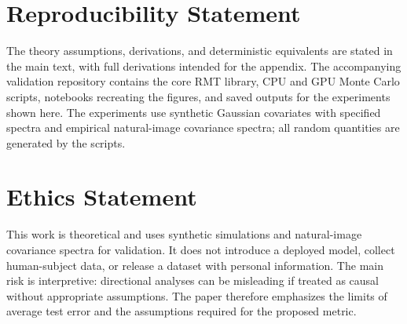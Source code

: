 \documentclass{article}
\theoremstyle{plain}
\theoremstyle{definition}
\begin{document}
\clearpage




\section{Reproducibility Statement}

The theory assumptions, derivations, and deterministic equivalents are stated in the main text, with full derivations intended for the appendix. The accompanying validation repository contains the core RMT library, CPU and GPU Monte Carlo scripts, notebooks recreating the figures, and saved outputs for the experiments shown here. The experiments use synthetic Gaussian covariates with specified spectra and empirical natural-image covariance spectra; all random quantities are generated by the scripts.

\section{Ethics Statement}

This work is theoretical and uses synthetic simulations and natural-image covariance spectra for validation. It does not introduce a deployed model, collect human-subject data, or release a dataset with personal information. The main risk is interpretive: directional analyses can be misleading if treated as causal without appropriate assumptions. The paper therefore emphasizes the limits of average test error and the assumptions required for the proposed metric.




\clearpage
\appendix
\tableofcontents{}


\end{document}
